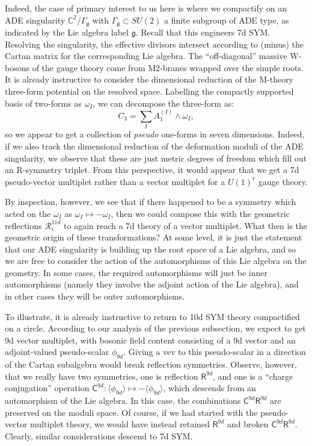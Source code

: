 \documentclass[12pt]{article}%
\numberwithin{equation}{section}
\renewcommand{\(}{\left(}
\renewcommand{\)}{\right)}
\renewcommand{\[}{\left[}
\renewcommand{\]}{\right]}
\begin{document}
Indeed, the case of primary interest to us here is where we compactify on an ADE singularity $\mathbb{C}^2 / \Gamma_{\mathfrak{g}}$ with $\Gamma_\mathfrak{g} \subset SU(2)$ a finite subgroup of ADE type, as indicated by the Lie algebra label $\mathfrak{g}$. Recall that this engineers 7d SYM. Resolving the singularity, the effective divisors intersect according to (minus) the Cartan matrix for the corresponding Lie algebra. The ``off-diagonal'' massive W-bosons of the gauge theory come from M2-branes wrapped over the simple roots. It is already instructive to consider the dimensional reduction of the M-theory three-form potential on the resolved space. Labelling the compactly supported basis of two-forms as $\omega_{I}$, we can decompose the three-form as:
\begin{equation}
C_{3} = \underset{I}{\sum} A^{(I)}_{1} \wedge \omega_{I},
\end{equation}
so we appear to get a collection of \textit{pseudo} one-forms in seven dimensions. Indeed, if we also track the dimensional reduction of the deformation moduli of the ADE singularity, we observe that these are just metric degrees of freedom which fill out an R-symmetry triplet.
From this perspective, it would appear that we get a 7d pseudo-vector multiplet rather than a vector multiplet for a $U(1)^r$ gauge theory.

By inspection, however, we see that if there happened to be a symmetry which acted on the $\omega_{I}$ as $\omega_{I} \mapsto - \omega_{I}$,
then we could compose this with the geometric reflections $\mathcal{R}_{i}^{11d}$ to again reach a 7d theory of a vector multiplet. What then is the geometric origin of these transformations? At some level, it is just the statement that our ADE singularity is building up the root space of a Lie algebra, and so we are free to consider the action of the automorphisms of this Lie algebra on the geometry. In some cases, the required automorphisms will just be inner automorphisms (namely they involve the adjoint action of the Lie algebra), and in other cases they will be outer automorphisms.

To illustrate, it is already instructive to return to 10d SYM theory compactified on a circle. According to our analysis of the previous subsection, we expect to get 9d vector multiplet, with bosonic field content consisting of a 9d vector and an adjoint-valued pseudo-scalar $\phi_{9d}$. Giving a vev to this pseudo-scalar in a direction of the Cartan subalgebra would break reflection symmetries. Observe, however, that we really have two symmetries, one is reflection $\mathsf{R}^{9d}$, and one is a ``charge conjugation'' operation $\mathsf{C}^{9d}: \langle \phi_{9d} \rangle \mapsto - \langle \phi_{9d} \rangle$, which descends from an automorphism of the Lie algebra. In this case, the combinations $\mathsf{C}^{9d} \mathsf{R}^{9d}$ are preserved on the moduli space. Of course, if we had started with the pseudo-vector multiplet theory, we would have instead retained $\mathsf{R}^{9d}$ and broken $\mathsf{C}^{9d} \mathsf{R}^{9d}$. Clearly, similar considerations descend to 7d SYM.
\end{document}
